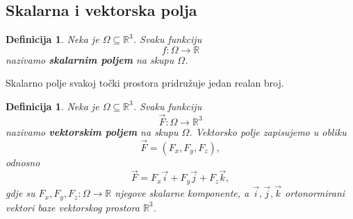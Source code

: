 \documentclass[12pt,a4paper]{article}
\newtheorem{deff}[tm]{Definicija}
\begin{document}
\subsection{Skalarna i vektorska polja}

\begin{deff}
Neka je $\Omega\subseteq\mathbb{R}^3$. Svaku funkciju
$$
f:\Omega\to\mathbb{R}
$$
nazivamo \textbf{\textit{skalarnim poljem}} na skupu $\Omega$.
\end{deff}

Skalarno polje svakoj točki prostora pridružuje jedan realan
broj.

\begin{deff}
Neka je $\Omega\subseteq\mathbb{R}^3$. Svaku funkciju
$$
\overrightarrow{F}:\Omega\to\mathbb{R}^3
$$
nazivamo \textbf{\textit{vektorskim poljem}} na skupu $\Omega$. Vektorsko polje
zapisujemo u obliku $$
\overrightarrow{F}=(F_x,F_y,F_z),
$$ odnosno
$$
\overrightarrow{F}
=
F_x\overrightarrow{i}
+
F_y\overrightarrow{j}
+
F_z\overrightarrow{k},
$$
gdje su $F_x,F_y,F_z:\Omega \to \mathbb{R}$ njegove skalarne komponente, a
$\overrightarrow{i},\overrightarrow{j},\overrightarrow{k}$ ortonormirani vektori baze vektorskog prostora $\mathbb{R}^3$.\end{deff}
\end{document}
